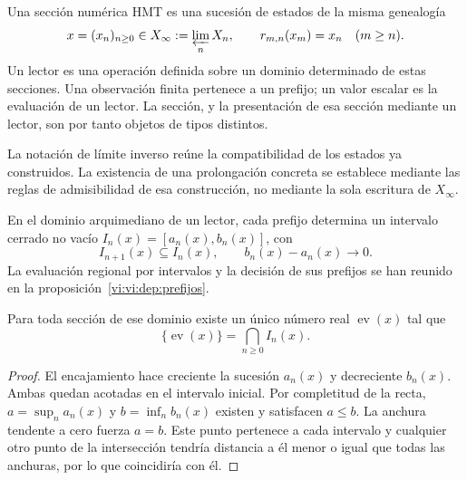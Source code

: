 \begin{definition}
Una sección numérica HMT es una sucesión de estados de la misma genealogía
\begin{equation}
 x=(x_n)_{n\ge0}\in X_\infty:=\varprojlim_n X_n,
 \qquad r_{m,n}(x_m)=x_n\quad(m\ge n).
 \label{vi:vi:hist:limite-inverso}
\end{equation}
Un lector es una operación definida sobre un dominio determinado de estas
secciones. Una observación finita pertenece a un prefijo; un valor escalar
es la evaluación de un lector. La sección, y la presentación de esa sección
mediante un lector, son por tanto objetos de tipos distintos.
\end{definition}

La notación de límite inverso reúne la compatibilidad de los estados ya
construidos. La existencia de una prolongación concreta se establece
mediante las reglas de admisibilidad de esa construcción, no mediante la
sola escritura de \(X_\infty\).

En el dominio arquimediano de un lector, cada prefijo determina un
intervalo cerrado no vacío \(I_n(x)=[a_n(x),b_n(x)]\), con
\begin{equation}
 I_{n+1}(x)\subseteq I_n(x),\qquad
 b_n(x)-a_n(x)\longrightarrow0.
 \label{vi:vi:hist:cilindros}
\end{equation}
La evaluación regional por intervalos y la decisión de sus prefijos se
han reunido en la proposición~\ref{vi:vi:dep:prefijos}.

\begin{proposition}
Para toda sección de ese dominio existe un único número real
\(\operatorname{ev}(x)\) tal que
\begin{equation}
 \{\operatorname{ev}(x)\}=\bigcap_{n\ge0}I_n(x).
 \label{vi:vi:hist:evaluacion}
\end{equation}
\end{proposition}
\begin{proof}
El encajamiento hace creciente la sucesión \(a_n(x)\) y decreciente
\(b_n(x)\). Ambas quedan acotadas en el intervalo inicial. Por
completitud de la recta, \(a=\sup_n a_n(x)\) y
\(b=\inf_n b_n(x)\) existen y satisfacen \(a\le b\).
La anchura tendente a cero fuerza \(a=b\). Este punto pertenece a cada
intervalo y cualquier otro punto de la intersección tendría distancia a
él menor o igual que todas las anchuras, por lo que coincidiría con él.
\end{proof}

